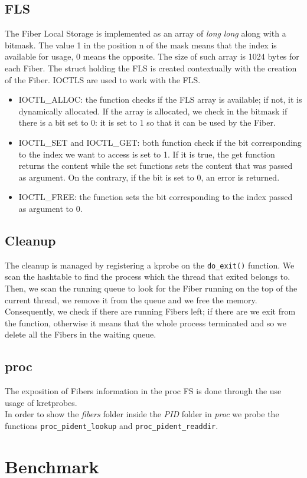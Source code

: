 \documentclass[11pt]{article}
\begin{document}
\subsection{FLS}
The Fiber Local Storage is implemented as an array of \textit{long} \textit{long} along with a bitmask. The value 1 in the position n of the mask means that the index is available for usage, 0 means the opposite. The size of such array is 1024 bytes for each Fiber. The struct holding the FLS is created contextually with the creation of the Fiber. IOCTLS are used to work with the FLS.
\begin{itemize}
\item IOCTL\_ALLOC: the function checks if the FLS array is available; if not, it is dynamically allocated. If the array is allocated, we check in the bitmask if there is a bit set to 0: it is set to 1 so that it can be used by the Fiber.
\item IOCTL\_SET and IOCTL\_GET: both function check if the bit corresponding to the index we want to access is set to 1. If it is true, the get function returns the content while the set functions sets the content that was passed as argument. On the contrary, if the bit is set to 0, an error is returned.
\item IOCTL\_FREE: the function sets the bit corresponding to the index passed as argument to 0.
\end{itemize}

\subsection{Cleanup}
The cleanup is managed by registering a kprobe on the \texttt{do\_exit()} function. We scan the hashtable to find the process which the thread that exited belongs to. Then, we scan the running queue to look for the Fiber running on the top of the current thread, we remove it from the queue and we free the memory. Consequently, we check if there are running Fibers left; if there are we exit from the function, otherwise it means that the whole process terminated and so we delete all the Fibers in the waiting queue.
\subsection{proc}
The exposition of Fibers information in the proc FS is done through the use usage of kretprobes.\\
In order to show the \textit{fibers} folder inside the \textit{PID} folder in \textit{proc} we probe the functions \texttt{proc\_pident\_lookup} and \texttt{proc\_pident\_readdir}.


\section{Benchmark}
\end{document}
